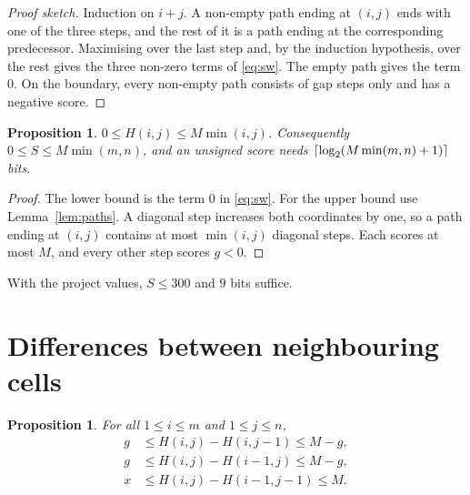 \documentclass[11pt]{article}
\theoremstyle{plain}
\newtheorem{proposition}[theorem]{Proposition}
\theoremstyle{definition}
\theoremstyle{remark}
\DeclarePairedDelimiter{\ceil}{\lceil}{\rceil}
\begin{document}
\begin{proof}[Proof sketch]
Induction on $i + j$. A non-empty path ending at $(i,j)$ ends with one of the
three steps, and the rest of it is a path ending at the corresponding
predecessor. Maximising over the last step and, by the induction hypothesis,
over the rest gives the three non-zero terms of \eqref{eq:sw}. The empty path
gives the term $0$. On the boundary, every non-empty path consists of gap steps
only and has a negative score.
\end{proof}

\begin{proposition}\label{prop:range}
$0 \le H(i,j) \le M \min(i,j)$. Consequently $0 \le S \le M\min(m,n)$, and an
unsigned score needs $\ceil{\log_2(M\min(m,n) + 1)}$ bits.
\end{proposition}

\begin{proof}
The lower bound is the term $0$ in \eqref{eq:sw}. For the upper bound use
Lemma~\ref{lem:paths}. A diagonal step increases both coordinates by one, so a
path ending at $(i,j)$ contains at most $\min(i,j)$ diagonal steps. Each scores
at most $M$, and every other step scores $g < 0$.
\end{proof}

With the project values, $S \le 300$ and $9$ bits suffice.

\section{Differences between neighbouring cells}

\begin{proposition}\label{prop:diff}
For all $1 \le i \le m$ and $1 \le j \le n$,
\begin{align}
g &\le H(i,j) - H(i,j-1) \le M - g, \label{eq:da}\\
g &\le H(i,j) - H(i-1,j) \le M - g, \label{eq:db}\\
x &\le H(i,j) - H(i-1,j-1) \le M. \label{eq:dc}
\end{align}
\end{proposition}
\end{document}
